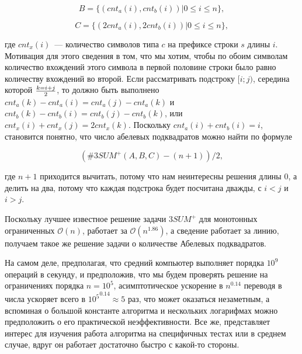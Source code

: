 \begin{equation}
B = \{ (cnt_a(i), cnt_b(i)) | 0 \le i \le n \},
\end{equation}

\begin{equation}
C = \{ (2cnt_a(i), 2cnt_b(i)) | 0 \le i \le n \},
\end{equation}


где $cnt_x(i)$~--- количество символов типа $c$ на префиксе строки $s$ длины $i$. Мотивация для этого сведения в том, что мы хотим, чтобы по обоим символам количество вхождений этого символа в первой половине строки было равно количеству вхождений во второй. Если рассматривать подстроку $[i; j)$, середина которой $k={i+j} \over 2$, то должно быть выполнено $cnt_a(k)-cnt_a(i)=cnt_a(j)-cnt_a(k)$ и $cnt_b(k)-cnt_b(i)=cnt_b(j)-cnt_b(k)$, или $cnt_x(i)+cnt_x(j)=2cnt_x(k)$. Поскольку $cnt_a(i)+cnt_b(i)=i$, становится понятно, что число абелевых подквадратов можно найти по формуле 

\begin{equation}
(\#3SUM^+(A, B, C) - (n+1)) / 2,
\end{equation}

где $n+1$ приходится вычитать, потому что нам неинтересны решения длины 0, а делить на два, потому что каждая подстрока будет посчитана дважды, с $i<j$ и $i>j$.

Поскольку лучшее известное решение задачи $3SUM^+$ для монотонных ограниченных $\mathcal{O}(n)$, работает за $\mathcal{O}(n^{1.86})$, а сведение работает за линию, получаем такое же решение задачи о количестве Абелевых подквадратов.

На самом деле, предполагая, что средний компьютер выполняет порядка $10^9$ операций в секунду, и предположив, что мы будем проверять решение на ограничениях порядка $n=10^5$, асимптотическое ускорение в $n^0.14$ переводя в числа ускоряет всего в ${10^5}^{0.14} \approx 5$ раз, что может оказаться незаметным, а вспоминая о большой константе алгоритма и нескольких логарифмах можно предположить о его практической неэффективности. Все же, представляет интерес для изучения работа алгоритма на специфичных тестах или в среднем случае, вдруг он работает достаточно быстро с какой-то стороны.

